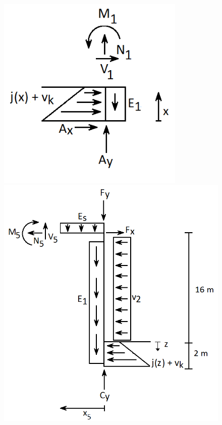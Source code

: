 \begin{figure}[H]\centering
	\begin{minipage}[b]{0.48\textwidth}\centering
		\includegraphics[width=0.80\textwidth]{billeder/snitet.png} %
	\end{minipage}\hfill
	\begin{minipage}[b]{0.48\textwidth}\centering
		\includegraphics[width=1.0\textwidth]{billeder/snitfem.png} %

\end{minipage}
\end{figure}
